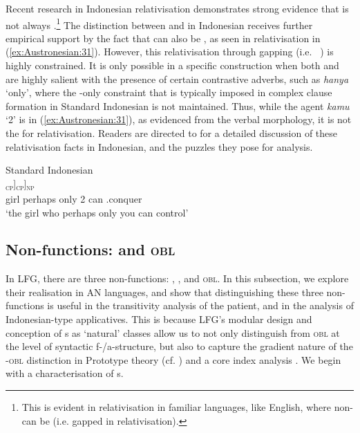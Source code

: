 \documentclass[output=paper,chinesefont]{../langscibook}
\begin{document}
\hspace*{-.4pt}Recent research in Indonesian relativisation demonstrates strong evidence that \PIVOT is not always \SUBJ.\footnote{This is evident in relativisation in familiar languages, like English, where non-\SUBJ can be \PIVOT (i.e. gapped in relativisation).} The distinction between \SUBJ and \PIVOT in Indonesian receives further empirical support by the fact that \OBJ can also be \PIVOT, as seen in relativisation in (\ref{ex:Austronesian:31}). However, this \OBJ relativisation through gapping (i.e. \OBJ~\PIVOT) is highly constrained. It is only possible in a specific construction when both \SUBJ and \OBJ are highly salient with the presence of certain contrastive adverbs, such as \emph{hanya} `only', where the \SUBJ-only constraint that is typically imposed in complex clause formation in Standard Indonesian is not maintained. Thus, while the agent \emph{kamu} `2\SG' is \SUBJ in (\ref{ex:Austronesian:31}), as evidenced from the verbal \AV morphology, it is not the \PIVOT for relativisation. Readers are directed to \citet{Arka2021} for a detailed discussion of these relativisation facts in Indonesian, and the puzzles they pose for analysis.

\ea\label{ex:Austronesian:31} Standard Indonesian  \citep[196]{Arka2021}\\
 \gll
 [\textbf{Gadis} [yang [(barangkali) [\textbf{hanya} \textbf{kamu} bisa menaklukkan~{\GAP}]\textsubscript{\textsc{cp}}]\textsubscript{\textsc{cp}}]\textsubscript{\textsc{np}}\\
 \phantom{[}girl \phantom{[}{\REL} \phantom{[}perhaps \phantom{[}only {2\SG} can \AV.conquer\\
 \glt`the girl who perhaps only you can control'
\z

\subsection{Non-\SUBJ functions: \OBJ and \textsc{obl}}
\label{sec:Austronesian:4.2}
\largerpage
In LFG, there are three non-\SUBJ functions: \OBJ, \OBJTHETA, and \textsc{obl}. In this subsection, we explore their realisation in AN languages, and show that distinguishing these three non-\SUBJ functions is useful in the transitivity analysis of the \AV patient, and in the analysis of Indonesian-type applicatives. This is because LFG's modular design and conception of {\GF}s as `natural' classes allow us to not only distinguish \OBJ from \textsc{obl} at the level of syntactic f-/a-structure, but also to capture the gradient nature of the \OBJ-\textsc{obl} distinction in Prototype theory (cf. \citealt{Taylor2003}) and a core index analysis \citep{Arka2017}. We begin with a characterisation of {\OBJ}s.
\end{document}
